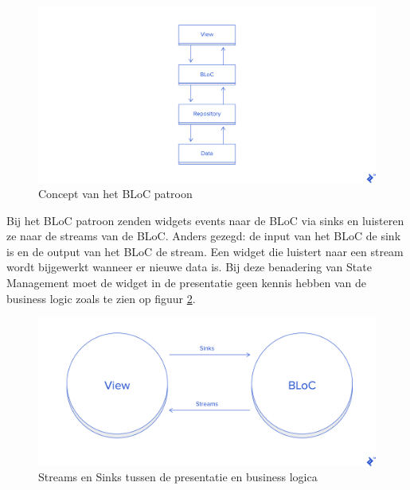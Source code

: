 \begin{figure}[H]
    \centering
    \includegraphics[width=0.9\linewidth]{img/stand-van-zaken/bloc-pattern.png}
    \caption{Concept van het BLoC patroon \autocite{Perutovic2018}}
    \label{fig:bloc-pattern}
\end{figure}

Bij het BLoC patroon zenden widgets events naar de BLoC via sinks en luisteren ze naar de streams van de BLoC.
Anders gezegd: de input van het BLoC de sink is en de output van het BLoC de stream. Een widget die luistert naar een stream wordt bijgewerkt wanneer er nieuwe data is. Bij deze benadering van State Management moet de widget in de presentatie geen kennis hebben van de business logic zoals te zien op figuur \ref{fig:bloc-pattern-streams-sinks}. \\


\begin{figure}[H]
    \centering
    \includegraphics[width=\figureWidthModifier\linewidth]{img/stand-van-zaken/bloc-pattern-streams-sinks.png}
    \caption{Streams en Sinks tussen de presentatie en business logica \autocite{Perutovic2018}}
    \label{fig:bloc-pattern-streams-sinks}
\end{figure}

